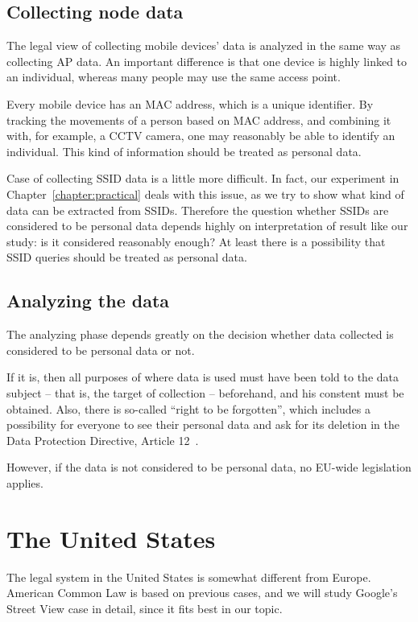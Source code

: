 \documentclass[12pt,a4paper,oneside,pdftex]{report}
\begin{document}
\subsection{Collecting node data}

The legal view of collecting mobile devices' data is analyzed in the same way as collecting AP data. An important difference is that one device is highly linked to an individual, whereas many people may use the same access point.

Every mobile device has an MAC address, which is a unique identifier. By tracking the movements of a person based on MAC address, and combining it with, for example, a CCTV camera, one may reasonably be able to identify an individual. This kind of information should be treated as personal data.

Case of collecting SSID data is a little more difficult. In fact, our experiment in Chapter~\ref{chapter:practical} deals with this issue, as we try to show what kind of data can be extracted from SSIDs. Therefore the question whether SSIDs are considered to be personal data depends highly on interpretation of result like our study: is it considered reasonably enough? At least there is a possibility that SSID queries should be treated as personal data.

\subsection{Analyzing the data}

The analyzing phase depends greatly on the decision whether data collected is considered to be personal data or not. 

If it is, then all purposes of where data is used must have been told to the data subject -- that is, the target of collection -- beforehand, and his constent must be obtained. Also, there is so-called ``right to be forgotten'', which includes a possibility for everyone to see their personal data and ask for its deletion in the Data Protection Directive, Article 12~\cite{data_protection}. 

However, if the data is not considered to be personal data, no EU-wide legislation applies. 


\section{The United States}

The legal system in the United States is somewhat different from Europe. American Common Law is based on previous cases, and we will study Google's Street View case in detail, since it fits best in our topic.
\end{document}
